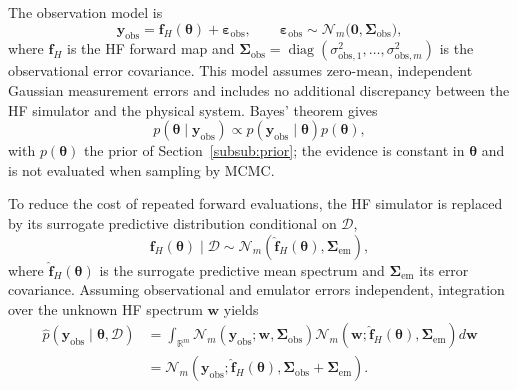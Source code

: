 \documentclass[12pt, letterpaper, oneside]{article}
\begin{document}
The observation model is
\begin{equation}
    \mathbf y_{\mathrm{obs}}
    =
    \mathbf f_H(\bm\theta)
    +\bm\varepsilon_{\mathrm{obs}},
    \qquad
    \bm\varepsilon_{\mathrm{obs}}
    \sim
    \mathcal N_{m}
    \bigl(\mathbf 0,\bm\Sigma_{\mathrm{obs}}\bigr),
    \label{eq:inversion-observation-model}
\end{equation}
where $\mathbf f_H$ is the HF forward map and
$\bm\Sigma_{\mathrm{obs}}=\operatorname{diag}(\sigma^2_{\mathrm{obs},1},
\ldots,\sigma^2_{\mathrm{obs},m})$ is the observational error covariance.
This model assumes zero-mean, independent Gaussian measurement errors and
includes no additional discrepancy between the HF simulator and the physical
system. Bayes' theorem gives
\begin{equation}
    p(\bm\theta\mid\mathbf y_{\mathrm{obs}})
    \propto
    p(\mathbf y_{\mathrm{obs}}\mid\bm\theta)
    p(\bm\theta),
    \label{eq:inversion-exact-posterior}
\end{equation}
with $p(\bm\theta)$ the prior of Section~\ref{subsub:prior}; the evidence is
constant in $\bm\theta$ and is not evaluated when sampling by MCMC.

To reduce the cost of repeated forward evaluations, the HF simulator is
replaced by its surrogate predictive distribution conditional on $\mathcal D$,
\begin{equation}
    \mathbf f_H(\bm\theta)\mid\mathcal D
    \sim
    \mathcal N_{m}\!\left(
        \widehat{\mathbf f}_H(\bm\theta),
        \bm\Sigma_{\mathrm{em}}
    \right),
    \label{eq:inversion-emulator-distribution}
\end{equation}
where $\widehat{\mathbf f}_H(\bm\theta)$ is the surrogate predictive mean
spectrum and $\bm\Sigma_{\mathrm{em}}$ its error covariance. Assuming
observational and emulator errors independent, integration over the unknown HF
spectrum $\mathbf w$ yields
\begin{align}
    \widehat p(\mathbf y_{\mathrm{obs}}
        \mid\bm\theta,\mathcal D)
    &=
    \int_{\mathbb R^{m}}
    \mathcal N_{m}\!\left(
        \mathbf y_{\mathrm{obs}};
        \mathbf w,\bm\Sigma_{\mathrm{obs}}
    \right)
    \mathcal N_{m}\!\left(
        \mathbf w;
        \widehat{\mathbf f}_H(\bm\theta),
        \bm\Sigma_{\mathrm{em}}
    \right)d\mathbf w
    \nonumber\\
    &=
    \mathcal N_{m}\!\left(
        \mathbf y_{\mathrm{obs}};
        \widehat{\mathbf f}_H(\bm\theta),
        \bm\Sigma_{\mathrm{obs}}
        +\bm\Sigma_{\mathrm{em}}
    \right).
    \label{eq:inversion-surrogate-likelihood}
\end{align}
\end{document}
